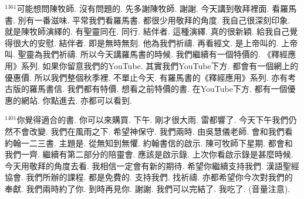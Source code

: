 \documentclass{book}
\begin{document}
$^{1361}$可能想問陳牧師.
沒有問題的.
先多謝陳牧師.
謝謝.
今天講到敬拜裡面.
看羅馬書.
別有一番滋味.
平常我們看羅馬書.
都很少用敬拜的角度.
我自己很深刻印象.
就是陳牧師演繹的.
有聖靈同在.
同行.
結伴者.
這種演繹.
真的很新穎.
給我自己覺得很大的安慰.
結伴者.
即是無時無刻.
他為我們祈禱.
再看經文.
是上帝叫的.
上帝叫.
聖靈為我們祈禱.
所以今天講羅馬書的時候.
我們繼續有一個特價的.
《釋經應用》系列.
如果你留意我們的YouTube.
其實我們YouTube下方.
都會有一個網上的優惠價.
所以我們整個秋季裡.
不單止今天.
有羅馬書的《釋經應用》系列.
亦有考古版的羅馬書信.
我們都有特價.
想看之前特價的書.
在YouTube下方.
都有一個優惠的網站.
你點進去.
亦都可以看到.

$^{1401}$你覺得適合的書.
你可以來購買.
下午.
剛才很大雨.
雷都響了.
今天下午我們仍然不會改變.
我們在風雨之下.
希望神保守.
我們兩時.
由吳慧儀老師.
會和我們看約翰一二三書.
主題是.
從無知到無懼.
約翰書信的啟示.
陳可牧師下星期.
都會和我們一齊.
繼續有第二部分的陪靈會.
應該是啟示錄.
上次你看啟示錄是甚麼時候.
今天用敬拜的角度去看.
我相信一定會有新的期待.
希望你繼續支持我們.
漢語聖經協會.
我們所辦的課程.
都是免費的.
支持我們.
找祈禱.
亦都希望你今次對我們的奉獻.
我們兩時約了你.
到時再見你.
謝謝.
我們可以完結了.
我吃了.
(音量注意).
\newpage
\end{document}
